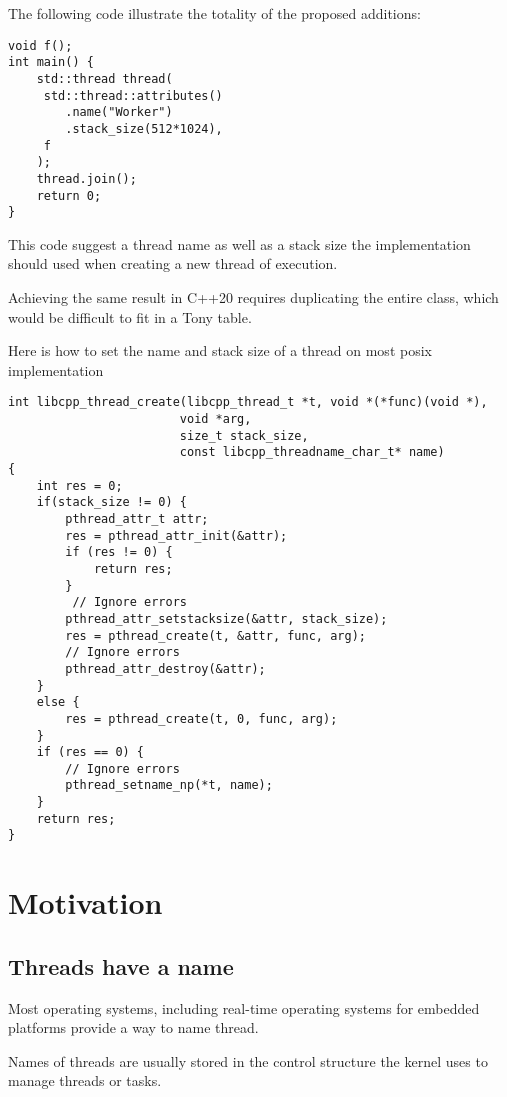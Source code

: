 \documentclass{wg21}
\begin{document}
The following code illustrate the totality of the proposed additions:

\begin{lstlisting}[style=MY]
void f();
int main() {
    std::thread thread(
     std::thread::attributes()
        .name("Worker")
        .stack_size(512*1024),
     f
    );
    thread.join();
    return 0;
}
\end{lstlisting}


This code suggest a thread name as well as a stack size 
the implementation should used when creating a new thread of execution.

Achieving the same result in C++20 requires duplicating the entire 
class, which would be difficult to fit in a Tony table.

\pagebreak

Here is how to set the name and stack size of a thread on most posix implementation

\begin{lstlisting}[style=MYSMALL]
int libcpp_thread_create(libcpp_thread_t *t, void *(*func)(void *),
                        void *arg,
                        size_t stack_size,
                        const libcpp_threadname_char_t* name)
{
    int res = 0;
    if(stack_size != 0) {
        pthread_attr_t attr;
        res = pthread_attr_init(&attr);
        if (res != 0) {
            return res;
        }
         // Ignore errors
        pthread_attr_setstacksize(&attr, stack_size);
        res = pthread_create(t, &attr, func, arg);
        // Ignore errors
        pthread_attr_destroy(&attr);
    }
    else {
        res = pthread_create(t, 0, func, arg);
    }
    if (res == 0) {
        // Ignore errors
        pthread_setname_np(*t, name);
    }
    return res;
}
\end{lstlisting}
\section{Motivation}

\subsection{Threads have a name}

Most operating systems, including real-time operating systems for embedded platforms
provide a way to name thread.

Names of threads are usually stored in the control structure the kernel uses to manage threads or tasks.
\end{document}
